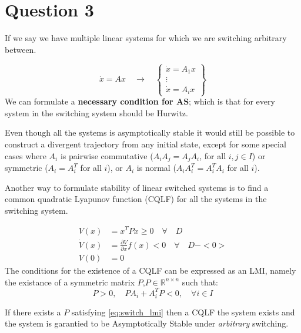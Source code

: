 \chapter{Question 3}
If we say we have multiple linear systems for which we are switching arbitrary between.

\begin{equation}
        \dot{x} = Ax \quad \rightarrow \quad
        \begin{Bmatrix}
                \dot{x} = A_1 x \\
                \vdots \\
                \dot{x} = A_i x
        \end{Bmatrix}
\end{equation}
We can formulate a \textbf{necessary condition for AS}; which is that for every system in the switching system should be
Hurwitz.

Even though all the systems is asymptotically stable it would still be possible to construct a divergent trajectory from
any initial state, except for some special cases where $A_i$ is pairwise commutative ($A_iA_j = A_j A_i$, for all $i,j
\in I$) or symmetric ($A_i = A_i^T$ for all $i$), or $A_i$ is normal ($A_iA_i^T = A_i^T A_i$ for all $i$).

Another way to formulate stability of linear switched systems is to find a common quadratic Lyapunov function (CQLF) for
all the systems in the switching system.

\begin{equation}
  \begin{split}
    V(x) &= x^T P x \geq 0 \quad \forall \quad D \\
    \dot{V}(x) &= \frac{\partial V}{\partial x} f(x) < 0 \quad \forall \quad D - <0> \\
    V(0) &= 0
  \end{split}
\end{equation}
The conditions for the existence of a CQLF can be expressed as an LMI, namely the existance of a symmetric matrix
$P$,$P \in \mathbb{R}^{n\times n}$ such that:
\begin{equation}
  P > 0, \quad PA_i + A_i^TP < 0, \quad \forall i \in I
  \label{eq:switch_lmi}
\end{equation}

If there exists a $P$ satisfying \eqref{eq:switch_lmi} then a CQLF the system exists and the system is garantied to be
Asymptotically Stable under \emph{arbitrary} switching.

